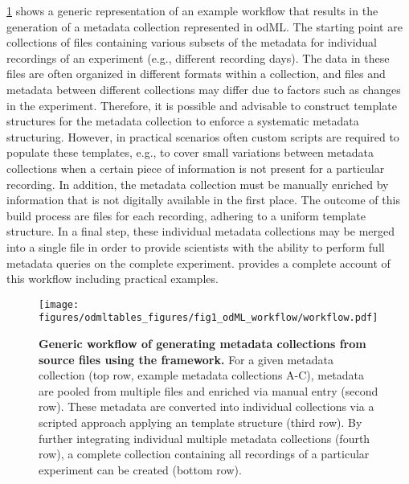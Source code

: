 \cref{fig:odMLgeneration} shows a generic representation of an example workflow that results in the generation of a metadata collection represented in odML. The starting point are collections of files containing various subsets of the metadata for individual recordings of an experiment (e.g., different recording days). The data in these files are often organized in different formats within a collection, and files and metadata between different collections may differ due to factors such as changes in the experiment. Therefore, it is possible and advisable to construct template structures for the metadata collection to enforce a systematic metadata structuring. However, in practical scenarios often custom scripts are required to populate these templates, e.g., to cover small variations between metadata collections when a certain piece of information is not present for a particular recording. In addition, the metadata collection must be manually enriched by information that is not digitally available in the first place. The outcome of this build process are  files for each recording, adhering to a uniform template structure. In a final step, these individual metadata collections may be merged into a single  file in order to provide scientists with the ability to perform full metadata queries on the complete experiment. \citet{Zehl_2016} provides a complete account of this workflow including practical examples.

\begin{figure}[hbt]
\begin{center}
\texttt{[image: figures/odmltables\_figures/fig1\_odML\_workflow/workflow.pdf]}
\caption[Generic workflow of generating metadata collections from source files using the  framework]{{\label{fig:odMLgeneration}
\textbf{Generic workflow of generating metadata collections from source files using the  framework.} For a given metadata collection (top row, example metadata collections A-C), metadata are pooled from multiple files and enriched via manual entry (second row). These metadata are converted into individual collections via a scripted approach applying an  template structure (third row). By further integrating individual multiple metadata collections (fourth row), a complete  collection containing all recordings of a particular experiment can be created (bottom row).
}}
\end{center}
\end{figure}

